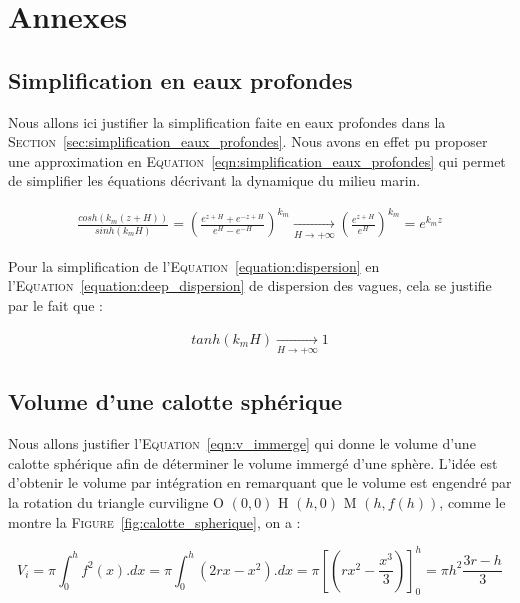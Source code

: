 \chapter{Annexes}
\label{annexe:gantt}

	\section{Simplification en eaux profondes}
	\label{annexe:deep_water}

		Nous allons ici justifier la simplification faite en eaux profondes dans la \textsc{Section}~\ref{sec:simplification_eaux_profondes}. Nous avons en effet pu proposer une approximation en \textsc{Equation}~\ref{eqn:simplification_eaux_profondes} qui permet de simplifier les équations décrivant la dynamique du milieu marin.

		\begin{eqnarray}
			\frac{cosh(k_m(z+H))}{sinh(k_mH)} = \left( \frac{e^{z+H} + e^{-z+H}}{e^{H}-e^{-H}} \right)^{k_m}  \xrightarrow[H \rightarrow + \infty]{}   \left( \frac{e^{z+H}}{e^{H}} \right)^{k_m} = e^{k_m z}
		\end{eqnarray}

		Pour la simplification de l'\textsc{Equation}~\ref{equation:dispersion} en l'\textsc{Equation}~\ref{equation:deep_dispersion} de dispersion des vagues, cela se justifie par le fait que :

		\begin{eqnarray}
			tanh(k_m H) \xrightarrow[H \rightarrow + \infty]{} 1
		\end{eqnarray}

	\section{Volume d'une calotte sphérique}
	\label{annexe:calotte_spherique}

		Nous allons justifier l'\textsc{Equation}~\ref{eqn:v_immerge} qui donne le volume d'une calotte sphérique afin de déterminer le volume immergé d'une sphère. L'idée est d'obtenir le volume par intégration en remarquant que le volume est engendré par la rotation du triangle curviligne O $(0, 0)$ H $(h, 0)$ M $(h, f(h))$, comme le montre la \textsc{Figure}~\ref{fig:calotte_spherique}, on a :

		\begin{equation}
			V_i = \pi \int_0^h f^2(x).dx = \pi \int_0^h (2rx - x^2).dx = \pi \left[(rx^2 - \frac{x^3}{3})\right]_0^h = \pi h^2 \frac{3r - h}{3}
		\end{equation}

